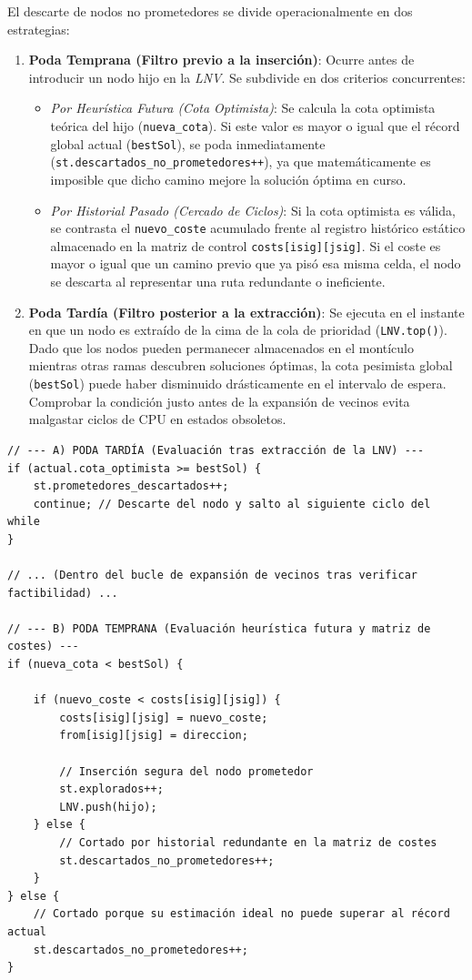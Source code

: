 \documentclass[11pt,a4paper]{article}
\begin{document}
El descarte de nodos no prometedores se divide operacionalmente en dos estrategias:

\begin{enumerate}
    \item \textbf{Poda Temprana (Filtro previo a la inserción)}: Ocurre antes de introducir un nodo hijo en la \textit{LNV}. Se subdivide en dos criterios concurrentes:
    \begin{itemize}
        \item \textit{Por Heurística Futura (Cota Optimista)}: Se calcula la cota optimista teórica del hijo (\texttt{nueva\_cota}). Si este valor es mayor o igual que el récord global actual (\texttt{bestSol}), se poda inmediatamente (\texttt{st.descartados\_no\_prometedores++}), ya que matemáticamente es imposible que dicho camino mejore la solución óptima en curso.
        \item \textit{Por Historial Pasado (Cercado de Ciclos)}: Si la cota optimista es válida, se contrasta el \texttt{nuevo\_coste} acumulado frente al registro histórico estático almacenado en la matriz de control \texttt{costs[isig][jsig]}. Si el coste es mayor o igual que un camino previo que ya pisó esa misma celda, el nodo se descarta al representar una ruta redundante o ineficiente.
    \end{itemize}
    
    \item \textbf{Poda Tardía (Filtro posterior a la extracción)}: Se ejecuta en el instante en que un nodo es extraído de la cima de la cola de prioridad (\texttt{LNV.top()}). Dado que los nodos pueden permanecer almacenados en el montículo mientras otras ramas descubren soluciones óptimas, la cota pesimista global (\texttt{bestSol}) puede haber disminuido drásticamente en el intervalo de espera. Comprobar la condición justo antes de la expansión de vecinos evita malgastar ciclos de CPU en estados obsoletos.
\end{enumerate}

\begin{lstlisting}[caption={Implementación de la poda tardía y temprana por cotas}, label={lst:poda_prometedores}]
// --- A) PODA TARDÍA (Evaluación tras extracción de la LNV) ---
if (actual.cota_optimista >= bestSol) {
    st.prometedores_descartados++;
    continue; // Descarte del nodo y salto al siguiente ciclo del while
}

// ... (Dentro del bucle de expansión de vecinos tras verificar factibilidad) ...

// --- B) PODA TEMPRANA (Evaluación heurística futura y matriz de costes) ---
if (nueva_cota < bestSol) {
    
    if (nuevo_coste < costs[isig][jsig]) {
        costs[isig][jsig] = nuevo_coste;
        from[isig][jsig] = direccion; 
        
        // Inserción segura del nodo prometedor
        st.explorados++;
        LNV.push(hijo);
    } else {
        // Cortado por historial redundante en la matriz de costes
        st.descartados_no_prometedores++;
    }
} else {
    // Cortado porque su estimación ideal no puede superar al récord actual
    st.descartados_no_prometedores++;
}
\end{lstlisting}
\end{document}
